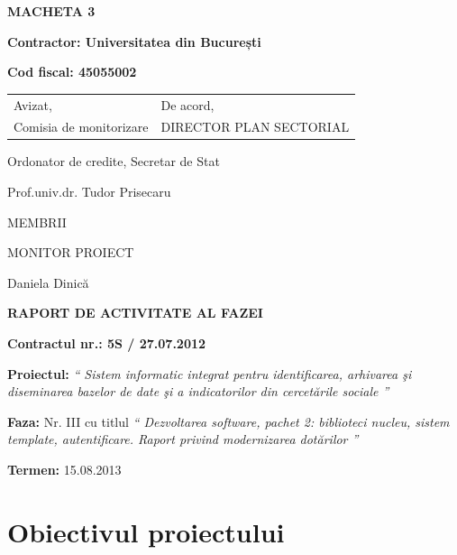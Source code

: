 \documentclass[a4paper, 10pt]{article}
\title{}
\author{}
\date{2013-04-08}
\begin{document}
{\raggedleft\bfseries
MACHETA 3
\par}

{\bfseries
Contractor: \foreignlanguage{romanian}{Universitatea din Bucure\c{s}ti}}

{\textbf{Cod fiscal: 45055002}

\bigskip

\bigskip

{\bfseries

\begin{tabular}{@{}l l}
Avizat,&De acord,\\
Comisia de monitorizare&DIRECTOR PLAN SECTORIAL\\
\end{tabular}
}

\bigskip

Ordonator de credite, Secretar de Stat

Prof.univ.dr. Tudor Prisecaru

\bigskip

\bigskip

\bigskip

MEMBRII

\medskip

\medskip

MONITOR PROIECT

Daniela Dinic\u{a}

\bigskip

\bigskip

\bigskip

\bigskip

{\centering\bfseries
RAPORT DE ACTIVITATE AL FAZEI
\par}

\bigskip

\bigskip

{\bfseries
Contractul nr.: 5S / 27.07.2012}

{
\textbf{Proiectul: }
\textit{`` Sistem informatic integrat pentru identificarea, arhivarea \c{s}i diseminarea bazelor de date \c{s}i a indicatorilor din
cercet\u{a}rile sociale ''}}

{
\textbf{Faza: }
Nr. III cu titlul
\textit{`` Dezvoltarea software, pachet 2: biblioteci nucleu, sistem template, autentificare. Raport privind modernizarea dot\u{a}rilor ''}}

{\textbf{Termen:} 15.08.2013}

\medskip

\section{Obiectivul proiectului}

}
\end{document}
